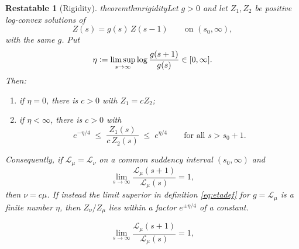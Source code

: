 \documentclass[10pt,a4paper]{amsart}
\newtheorem{restatable}{Restatable}
\providecommand{\Leh}{\mathscr{L}}
\providecommand{\eqdef}{\mathrel{\vcentcolon=}}
\begin{document}
	\begin{restatable}[Rigidity]{theorem}{thmrigidity}\label{thm:rigidity}
		Let $g>0$ and let $Z_1,Z_2$ be positive log-convex solutions of
		\begin{equation}\label{eq:funceq}
			Z(s)=g(s)\,Z(s-1)\qquad\text{on }(s_0,\infty),
		\end{equation}
		with the same $g$. Put
		\begin{equation}\label{eq:etadef}
			\eta\eqdef\limsup_{s\to\infty}
			\log\frac{g(s+1)}{g(s)}\in[0,\infty] .
		\end{equation}
		Then:
		\begin{enumerate}[label=\textup{(\roman*)},leftmargin=2.2em]
			\item if $\eta=0$, there is $c>0$ with $Z_1=cZ_2$;
			\item if $\eta<\infty$, there is $c>0$ with
			\begin{equation}\label{eq:quantgauge}
				e^{-\eta/4}\;\le\;\frac{Z_1(s)}{c\,Z_2(s)}\;\le\;e^{\eta/4}
				\qquad\text{for all }s>s_0+1 .
			\end{equation}
		\end{enumerate}
		Consequently, if $\Leh_\mu=\Leh_\nu$ on a common suddency interval
		$(s_0,\infty)$ and
		\begin{equation}\label{eq:ratiocond}
			\lim_{s\to\infty}\frac{\Leh_\mu(s+1)}{\Leh_\mu(s)}=1,
		\end{equation}
		then $\nu=c\mu$. If instead the limit
		superior in definition \eqref{eq:etadef} for $g=\Leh_\mu$ is a
		finite number $\eta$, then $Z_\nu/Z_\mu$ lies within a factor
		$e^{\pm\eta/4}$ of a constant.
	\end{restatable}

		\begin{equation}
			\lim_{s\to\infty}\frac{\Leh_\mu(s+1)}{\Leh_\mu(s)}=1,
		\end{equation}
\end{document}
